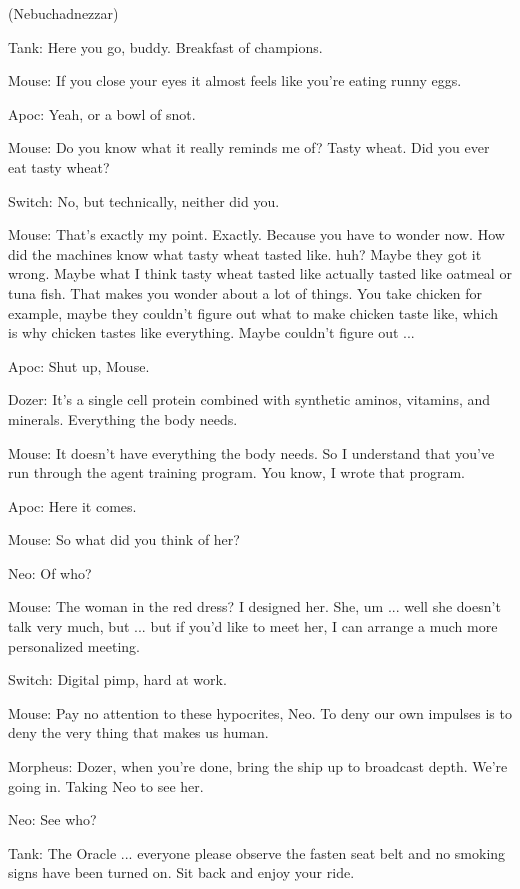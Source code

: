 \documentclass[UTF8]{ctexart}
\newenvironment{myquote}{\color{green} \setlength{\leftskip}{6em} \setlength{\rightskip}{4em} \setlength{\parindent}{-2em}}{\par}
\begin{document}
\begin{myquote}
(Nebuchadnezzar)

Tank: Here you go, buddy. Breakfast of champions.

Mouse: If you close your eyes it almost feels like you're eating runny eggs.

Apoc: Yeah, or a bowl of snot.

Mouse: Do you know what it really reminds me of? Tasty wheat. Did you ever eat tasty wheat?

Switch: No, but technically, neither did you.

Mouse: That's exactly my point. Exactly. Because you have to wonder now. How did the machines know what tasty wheat tasted like. huh? Maybe they got it wrong. Maybe what I think tasty wheat tasted like actually tasted like oatmeal or tuna fish. That makes you wonder about a lot of things. You take chicken for example, maybe they couldn't figure out what to make chicken taste like, which is why chicken tastes like everything. Maybe couldn't figure out ...

Apoc: Shut up, Mouse.

Dozer: It's a single cell protein combined with synthetic aminos, vitamins, and minerals. Everything the body needs.

Mouse: It doesn't have everything the body needs. So I understand that you've run through the agent training program. You know, I wrote that program.

Apoc: Here it comes.

Mouse: So what did you think of her?

Neo: Of who?

Mouse: The woman in the red dress? I designed her. She, um ... well she doesn't talk very much, but ... but if you'd like to meet her, I can arrange a much more personalized meeting.

Switch: Digital pimp, hard at work.

Mouse: Pay no attention to these hypocrites, Neo. To deny our own impulses is to deny the very thing that makes us human.

Morpheus: Dozer, when you're done, bring the ship up to broadcast depth. We're going in. Taking Neo to see her.

Neo: See who?

Tank: The Oracle ... everyone please observe the fasten seat belt and no smoking signs have been turned on. Sit back and enjoy your ride.
\end{myquote}
\end{document}
